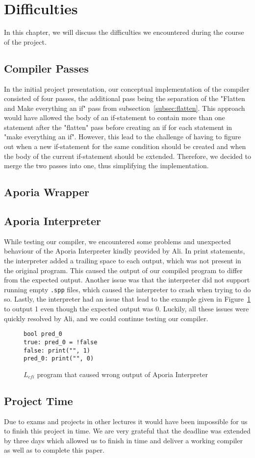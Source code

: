 \section{Difficulties}
In this chapter, we will discuss the difficulties we encountered during the course of the project.

\subsection{Compiler Passes}
In the initial project presentation, our conceptual implementation of the compiler consisted of four passes, the additional pass being the separation of the "Flatten and Make everything an if" pass from subsection~\ref{subsec:flatten}. This approach would have allowed the body of an if-statement to contain more than one statement after the "flatten" pass before creating an if for each statement in "make everything an if". However, this lead to the challenge of having to figure out when a new if-statement for the same condition should be created and when the body of the current if-statement should be extended. Therefore, we decided to merge the two passes into one, thus simplifying the implementation.

\subsection{Aporia Wrapper}

\subsection{Aporia Interpreter}
While testing our compiler, we encountered some problems and unexpected behaviour of the Aporia Interpreter kindly provided by Ali.
In print statements, the interpreter added a trailing space to each output, which was not present in the original program. This caused the output of our compiled program to differ from the expected output.
Another issue was that the interpreter did not support running empty \texttt{.spp} files, which caused the interpreter to crash when trying to do so.
Lastly, the interpreter had an issue that lead to the example given in Figure~\ref{code:aporia_issue} to output 1 even though the expected output was 0.
Luckily, all these issues were quickly resolved by Ali, and we could continue testing our compiler.

\begin{figure}[h!]
	\begin{lstlisting}
bool pred_0
true: pred_0 = !false
false: print("", 1)
pred_0: print("", 0) 
	\end{lstlisting}
	\caption{$L_{cfi}$ program that caused wrong output of Aporia Interpreter}
	\label{code:aporia_issue}
\end{figure}

\subsection{Project Time}
Due to exams and projects in other lectures it would have been impossible for us to finish this project in time. We are very grateful that the deadline was extended by three days which allowed us to finish in time and deliver a working compiler as well as to complete this paper.
